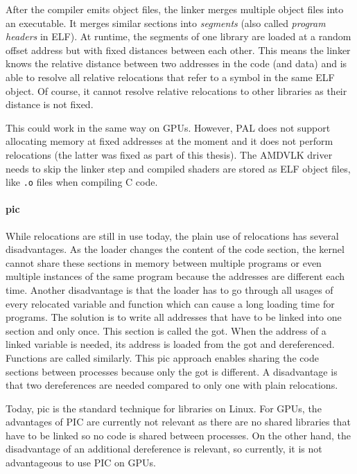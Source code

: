 After the compiler emits object files, the linker merges multiple object files into an executable. It merges similar sections into \emph{segments} (also called \emph{program headers} in ELF). At runtime, the segments of one library are loaded at a random offset address but with fixed distances between each other. This means the linker knows the relative distance between two addresses in the code (and data) and is able to resolve all relative relocations that refer to a symbol in the same ELF object. Of course, it cannot resolve relative relocations to other libraries as their distance is not fixed.

This could work in the same way on GPUs. However, PAL does not support allocating memory at fixed addresses at the moment and it does not perform relocations (the latter was fixed as part of this thesis). The AMDVLK driver needs to skip the linker step and compiled shaders are stored as ELF object files, like \texttt{.o} files when compiling C code.

\paragraph{\acrlong{pic}} While relocations are still in use today, the plain use of relocations has several disadvantages. As the loader changes the content of the code section, the kernel cannot share these sections in memory between multiple programs or even multiple instances of the same program because the addresses are different each time.
Another disadvantage is that the loader has to go through all usages of every relocated variable and function which can cause a long loading time for programs. The solution is to write all addresses that have to be linked into one section and only once. This section is called the \gls{got}.
When the address of a linked variable is needed, its address is loaded from the \gls{got} and dereferenced. Functions are called similarly. This \gls{pic} approach enables sharing the code sections between processes because only the \gls{got} is different. A disadvantage is that two dereferences are needed compared to only one with plain relocations.~\cite{BenderskyPic}

Today, \gls{pic} is the standard technique for libraries on Linux. For GPUs, the advantages of PIC are currently not relevant as there are no shared libraries that have to be linked so no code is shared between processes. On the other hand, the disadvantage of an additional dereference is relevant, so currently, it is not advantageous to use PIC on GPUs.
